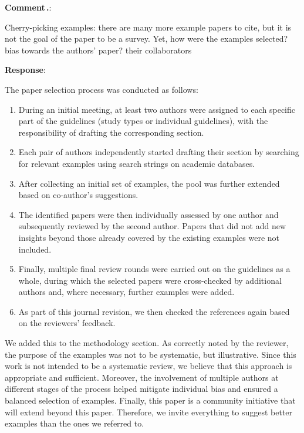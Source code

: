 \documentclass[11pt]{article}
\makeatletter
\newcounter{reviewer}
\newcounter{comment}[reviewer]
\renewcommand{\thecomment}{Comment\,\thereviewer.\arabic{comment}}
\newenvironment{reviewcomment}
{%
  \refstepcounter{comment}%
  \begingroup
    \edef\@tempa{comment:\thereviewer.\arabic{comment}}%
    \label{\@tempa}%
  \endgroup
  \needspace{8\baselineskip}%
  \bigskip\noindent
  \textbf{\thecomment}:%
  \begin{commentquote}{}%
}%
{%
  \end{commentquote}%
  \medskip\par
}
\newenvironment{response}
{%
  \needspace{6\baselineskip}%
  \par\medskip\noindent\textbf{Response}:\\%
  \phantomsection%
  \begingroup
    \edef\@tempa{response:\thereviewer.\arabic{comment}}%
    \label{\@tempa}%
  \endgroup
}
{%
  \medskip\par
}
\makeatother
\begin{document}
\begin{reviewcomment}
Cherry-picking examples: there are many more example papers to cite, but it is not the goal of the paper to be a survey. Yet, how were the examples selected? bias towards the authors' paper? their collaborators
\end{reviewcomment}
\begin{response}

The paper selection process was conducted as follows:
\begin{enumerate}
    \item During an initial meeting, at least two authors were assigned to each specific part of the guidelines (study types or individual guidelines), with the responsibility of drafting the corresponding section.
    \item Each pair of authors independently started drafting their section by searching for relevant examples using search strings on academic databases.
    \item After collecting an initial set of examples, the pool was further extended based on co-author's suggestions.
    \item The identified papers were then individually assessed by one author and subsequently reviewed by the second author. Papers that did not add new insights beyond those already covered by the existing examples were not included.
    \item Finally, multiple final review rounds were carried out on the guidelines as a whole, during which the selected papers were cross-checked by additional authors and, where necessary, further examples were added.
    \item As part of this journal revision, we then checked the references again based on the reviewers' feedback.
\end{enumerate}

We added this to the methodology section.
As correctly noted by the reviewer, the purpose of the examples was not to be systematic, but illustrative. Since this work is not intended to be a systematic review, we believe that this approach is appropriate and sufficient. Moreover, the involvement of multiple authors at different stages of the process helped mitigate individual bias and ensured a balanced selection of examples.
Finally, this paper is a community initiative that will extend beyond this paper.
Therefore, we invite everything to suggest better examples than the ones we referred to.


\end{response}
\end{document}
